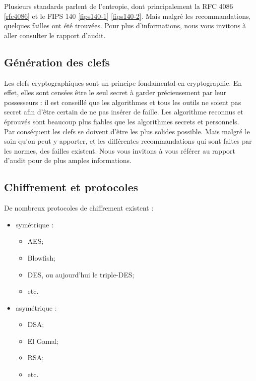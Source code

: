 Plusieurs standards parlent de l'entropie, dont principalement la RFC 4086 \ref{rfc4086} et le FIPS 140 \ref{fips140-1} \ref{fips140-2}. Mais malgré les recommandations, quelques failles ont été trouvées. Pour plus d'informations, nous vous invitons à aller consulter le rapport d'audit.

\subsection{Génération des clefs}

Les clefs cryptographiques sont un principe fondamental en cryptographie. En effet, elles sont censées être le seul secret à garder précieusement par leur possesseurs : il est conseillé que les algorithmes et tous les outils ne soient pas secret afin d'être certain de ne pas insérer de faille. Les algorithme reconnus et éprouvés sont beaucoup plus fiables que les algorithmes secrets et personnels.\\

Par conséquent les clefs se doivent d'être les plus solides possible. Mais malgré le soin qu'on peut y apporter, et les différentes recommandations qui sont faites par les normes, des failles existent. Nous vous invitons à vous référer au rapport d'audit pour de plus amples informations.

\subsection{Chiffrement et protocoles}
De nombreux protocoles de chiffrement existent : 
\begin{itemize}
	\item symétrique :
	\begin {itemize}
		\item AES;
		\item Blowfish;
		\item DES, ou aujourd'hui le triple-DES;
		\item etc.\\
	\end{itemize}
	\item asymétrique : 
	\begin {itemize}
		\item DSA;
		\item El Gamal;
		\item RSA;
		\item etc.\\
	\end{itemize}
\end{itemize}

